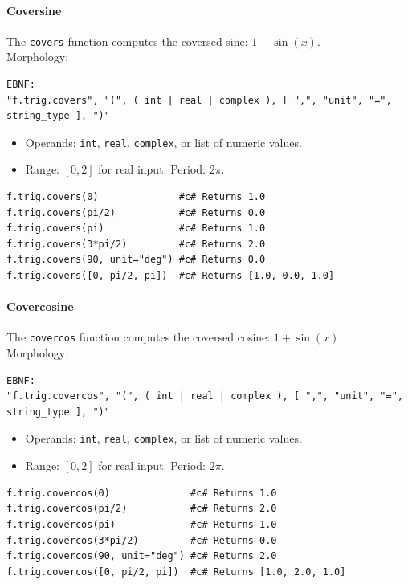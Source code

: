 \paragraph{Coversine}
The \texttt{covers} function computes the coversed sine: $1 - \sin(x)$.\\
Morphology:
\begin{verbatim}
EBNF:
"f.trig.covers", "(", ( int | real | complex ), [ ",", "unit", "=", string_type ], ")"
\end{verbatim}
\begin{itemize}
\item Operands: \texttt{int}, \texttt{real}, \texttt{complex}, or list of numeric values.
\item Range: $[0, 2]$ for real input. Period: $2\pi$.
\end{itemize}
\begin{verbatim}
f.trig.covers(0)              #c# Returns 1.0
f.trig.covers(pi/2)           #c# Returns 0.0
f.trig.covers(pi)             #c# Returns 1.0
f.trig.covers(3*pi/2)         #c# Returns 2.0
f.trig.covers(90, unit="deg") #c# Returns 0.0
f.trig.covers([0, pi/2, pi])  #c# Returns [1.0, 0.0, 1.0]
\end{verbatim}

\paragraph{Covercosine}
The \texttt{covercos} function computes the coversed cosine: $1 + \sin(x)$.\\
Morphology:
\begin{verbatim}
EBNF:
"f.trig.covercos", "(", ( int | real | complex ), [ ",", "unit", "=", string_type ], ")"
\end{verbatim}
\begin{itemize}
\item Operands: \texttt{int}, \texttt{real}, \texttt{complex}, or list of numeric values.
\item Range: $[0, 2]$ for real input. Period: $2\pi$.
\end{itemize}
\begin{verbatim}
f.trig.covercos(0)              #c# Returns 1.0
f.trig.covercos(pi/2)           #c# Returns 2.0
f.trig.covercos(pi)             #c# Returns 1.0
f.trig.covercos(3*pi/2)         #c# Returns 0.0
f.trig.covercos(90, unit="deg") #c# Returns 2.0
f.trig.covercos([0, pi/2, pi])  #c# Returns [1.0, 2.0, 1.0]
\end{verbatim}


